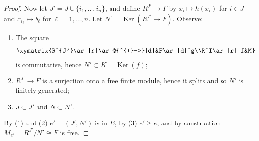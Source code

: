 \begin{proof}
Now let $J'=J\cup\{i_1,\ldots,i_n\}$, and define $R^{J'}\to F$ by $x_i\mapsto h(x_i)$ for $i\in J$ and $x_{i_\ell}\mapsto b_\ell$ for $\ell=1,\ldots,n$. Let $N'=\operatorname{Ker}(R^{J'}\to F)$. Observe:
\begin{enumerate}
\item The square
\[\xymatrix{R^{J'}\ar[r]\ar@{^{(}->}[d]&F\ar[d]^g\\R^I\ar[r]_f&M}\]
is commutative, hence $N'\subset K=\operatorname{Ker}(f)$;
\item $R^{J'}\to F$ is a surjection onto a free finite module, hence it splits and so $N'$ is finitely generated;
\item $J\subset J'$ and $N\subset N'$.
\end{enumerate}
By (1) and (2) $e'=(J',N')$ is in $E$, by (3) $e'\geq e$, and by construction $M_{e'}=R^{J'}/N'\cong F$ is free.
\end{proof}
